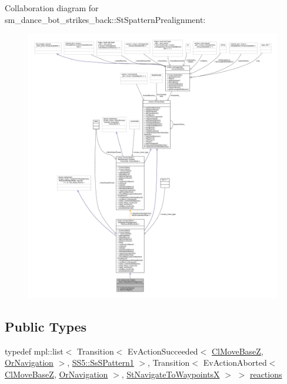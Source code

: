 Collaboration diagram for sm\+\_\+dance\+\_\+bot\+\_\+strikes\+\_\+back\+:\+:St\+Spattern\+Prealignment\+:
\nopagebreak
\begin{figure}[H]
\begin{center}
\leavevmode
\includegraphics[width=350pt]{structsm__dance__bot__strikes__back_1_1StSpatternPrealignment__coll__graph}
\end{center}
\end{figure}
\subsection*{Public Types}
\begin{DoxyCompactItemize}
\item 
typedef mpl\+::list$<$ Transition$<$ Ev\+Action\+Succeeded$<$ \hyperlink{classcl__move__base__z_1_1ClMoveBaseZ}{Cl\+Move\+BaseZ}, \hyperlink{classsm__dance__bot__strikes__back_1_1OrNavigation}{Or\+Navigation} $>$, \hyperlink{structsm__dance__bot__strikes__back_1_1SS5_1_1SsSPattern1}{S\+S5\+::\+Ss\+S\+Pattern1} $>$, Transition$<$ Ev\+Action\+Aborted$<$ \hyperlink{classcl__move__base__z_1_1ClMoveBaseZ}{Cl\+Move\+BaseZ}, \hyperlink{classsm__dance__bot__strikes__back_1_1OrNavigation}{Or\+Navigation} $>$, \hyperlink{structsm__dance__bot__strikes__back_1_1StNavigateToWaypointsX}{St\+Navigate\+To\+WaypointsX} $>$ $>$ \hyperlink{structsm__dance__bot__strikes__back_1_1StSpatternPrealignment_ac474c30f4538ff38707a3ce571a635a0}{reactions}
\end{DoxyCompactItemize}
